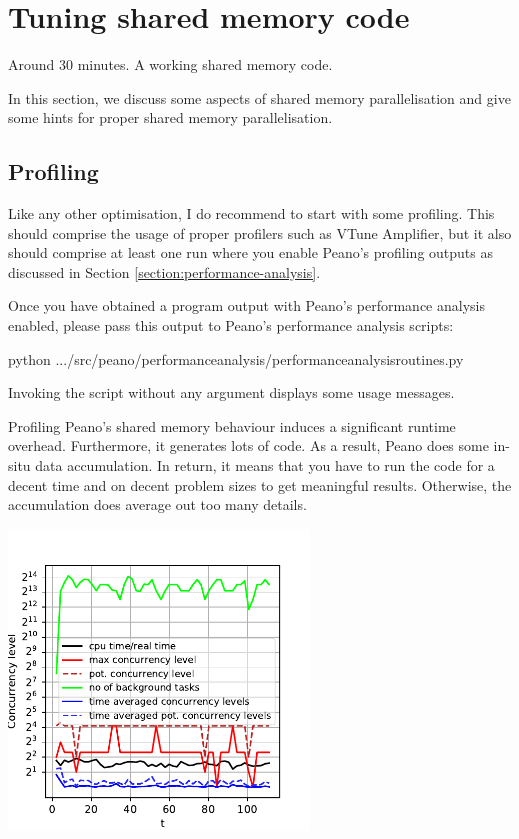 \section{Tuning shared memory code}


\chapterDescription
  {
    Around 30 minutes.
  }
  {
    A working shared memory code.
  }


In this section, we discuss some aspects of shared memory parallelisation and
give some hints for proper shared memory parallelisation.


\subsection{Profiling}

Like any other optimisation, I do recommend to start with some profiling. This
should comprise the usage of proper profilers such as VTune Amplifier, but it
also should comprise at least one run where you
enable Peano's profiling outputs as discussed in
Section \ref{section:performance-analysis}.

Once you have obtained a program output with Peano's performance analysis
enabled, please pass this output to Peano's performance analysis scripts:
\begin{code}
python .../src/peano/performanceanalysis/performanceanalysisroutines.py
\end{code}
\noindent
Invoking the script without any argument displays some usage messages.


\begin{remark}
 Profiling Peano's shared memory behaviour induces a significant runtime
 overhead. Furthermore, it generates lots of code. As a result, Peano does some
 in-situ data accumulation. In return, it means that you have to run the code
 for a decent time and on decent problem sizes to get meaningful results.
 Otherwise, the accumulation does average out too many details.
\end{remark}


\begin{center}
 \includegraphics[width=0.6\textwidth]{67_shared-memory-tuning/trace-concurrency.pdf}
\end{center}

